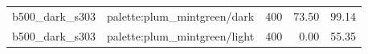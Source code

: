 \begin{longtable}{l>{\raggedright\arraybackslash}p{.42\linewidth}rrr}
b500\_\allowbreak{}dark\_\allowbreak{}s303 & %
palette:plum\_\allowbreak{}mintgreen/dark & %
400 & %
73.50 & %
99.14 \\ %

b500\_\allowbreak{}dark\_\allowbreak{}s303 & %
palette:plum\_\allowbreak{}mintgreen/light & %
400 & %
0.00 & %
55.35 \\ %


\end{longtable}
